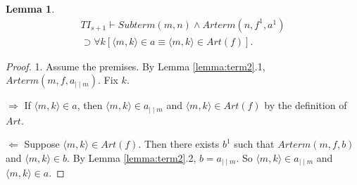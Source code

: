 \documentclass{asl}
\newtheorem{lemma}{Lemma}[section]
\theoremstyle{definition}
\begin{document}
\begin{lemma}
\begin{multline*}
TI_{s+1}\vdash Subterm(m,n)\wedge Arterm(n,f^1,a^1)
\\
\supset\forall k\left[ \langle m,k\rangle\in a
\equiv\langle m,k\rangle\in Art(f)\right].
\end{multline*}
\label{lemma:term4}
\end{lemma}
\begin{proof}
1. Assume the premises. By Lemma \ref{lemma:term2}.1, $Arterm(m,f,a_{\mid\mid m})$. Fix $k$.

$\Rightarrow$ If $\langle m,k\rangle\in a$, then $\langle m,k\rangle\in a_{\mid\mid m}$ and $\langle m,k\rangle\in Art(f)$ by the definition of $Art$.

$\Leftarrow$ Suppose $\langle m,k\rangle\in Art(f)$. Then there exists $b^1$ such that $Arterm(m,f,b)$ and $\langle m,k\rangle\in b$. By Lemma \ref{lemma:term2}.2, $b=a_{\mid\mid m}$. So $\langle m,k\rangle\in a_{\mid\mid m}$ and $\langle m,k\rangle\in a$.
\end{proof}
\end{document}
